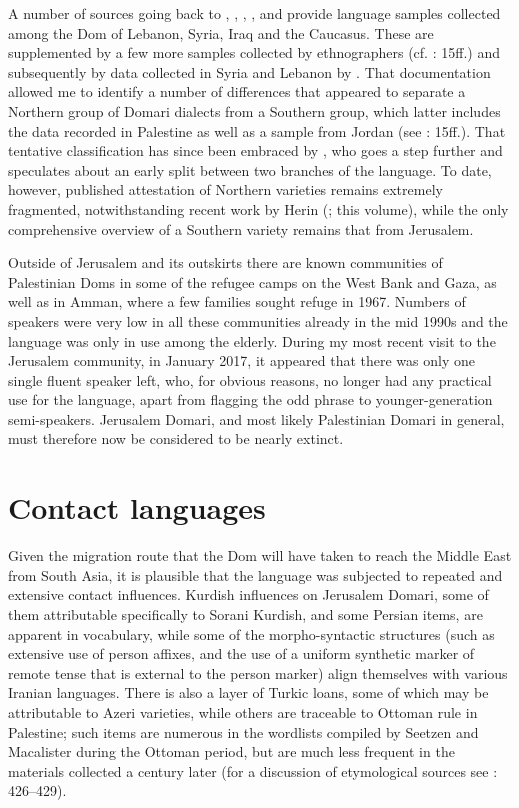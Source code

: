 \documentclass[output=paper]{langsci/langscibook}
\begin{document}
A number of sources going back to \citet{Pott1846}, \citet{Newbold1856}, \citet{Paspati1870}, \citet{Patkanoff1907}, and \citet{Black1913} provide language samples collected among the Dom of Lebanon, Syria, Iraq and the Caucasus. These are supplemented by a few more samples collected by ethnographers (cf. \citealt{Matras2012}: 15ff.) and subsequently by data collected in Syria and Lebanon by \citet{Herin2012}. That documentation allowed me to identify a number of differences that appeared to separate a Northern group of Domari dialects from a Southern group, which latter includes the data recorded in Palestine as well as a sample from Jordan (see \citealt{Matras2012}: 15ff.). That tentative classification has since been embraced by \citet{Herin2014Domari}, who goes a step further and speculates about an early split between two branches of the language. To date, however, published attestation of Northern varieties remains extremely fragmented, notwithstanding recent work by Herin (\citeyear{Herin2016}; this volume), while the only comprehensive overview of a Southern variety remains that from Jerusalem.

Outside of Jerusalem and its outskirts there are known communities of Palestinian Doms in some of the refugee camps on the West Bank and Gaza, as well as in Amman, where a few families sought refuge in 1967. Numbers of speakers were very low in all these communities already in the mid 1990s and the language was only in use among the elderly. During my most recent visit to the Jerusalem community, in  January 2017, it appeared that there was only one single fluent speaker left, who, for obvious reasons, no longer had any practical use for the language, apart from flagging the odd phrase to younger-generation semi-speakers. Jerusalem Domari, and most likely Palestinian Domari in general, must therefore now be considered to be nearly extinct.

\section{Contact languages
}\label{sec2}

Given the migration route that the Dom will have taken to reach the Middle East from South Asia, it is plausible that the language was subjected to repeated and extensive contact influences. Kurdish influences on Jerusalem Domari, some of them attributable specifically to Sorani Kurdish, and some Persian items, are apparent in vocabulary, while some of the morpho-syntactic structures (such as extensive use of person affixes, and the use of a uniform synthetic marker of remote tense that is external to the person marker) align themselves with various Iranian languages. There is also a layer of Turkic loans, some of which may be attributable to Azeri varieties, while others are traceable to Ottoman rule in Palestine; such items are numerous in the wordlists compiled by Seetzen and Macalister during the Ottoman period, but are much less frequent in the materials collected a century later (for a discussion of etymological sources see \citealt{Matras2012}: 426–429).
\end{document}
